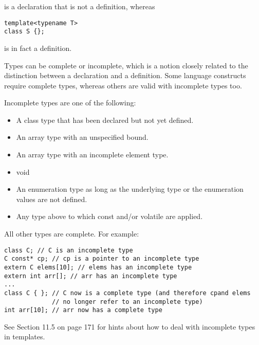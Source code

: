 is a declaration that is not a definition, whereas

\begin{lstlisting}[style=styleCXX]
template<typename T>
class S {};
\end{lstlisting}

is in fact a definition.


Types can be complete or incomplete, which is a notion closely related to the distinction between a declaration and a definition. Some language constructs require complete types, whereas others are valid with incomplete types too.

Incomplete types are one of the following:

\begin{itemize}
\item 
A class type that has been declared but not yet defined.

\item 
 An array type with an unspecified bound.

\item 
An array type with an incomplete element type.

\item 
void

\item 
An enumeration type as long as the underlying type or the enumeration values are not defined.

\item 
Any type above to which const and/or volatile are applied.
\end{itemize}

All other types are complete. For example:

\begin{lstlisting}[style=styleCXX]
class C; // C is an incomplete type
C const* cp; // cp is a pointer to an incomplete type
extern C elems[10]; // elems has an incomplete type
extern int arr[]; // arr has an incomplete type
...
class C { }; // C now is a complete type (and therefore cpand elems
			 // no longer refer to an incomplete type)
int arr[10]; // arr now has a complete type
\end{lstlisting}

See Section 11.5 on page 171 for hints about how to deal with incomplete types in templates.























